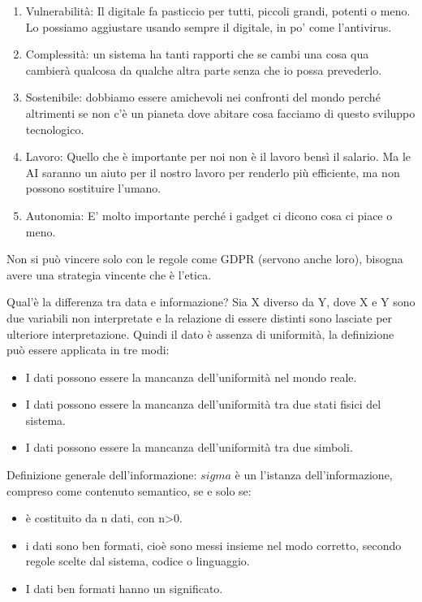 \documentclass[]{article}
\begin{document}
\begin{enumerate}
	\def\labelenumi{\arabic{enumi})}
	 
	\item
	Vulnerabilità: Il digitale fa pasticcio per tutti, piccoli grandi,
	potenti o meno. Lo possiamo aggiustare usando sempre il digitale, in
	po' come l'antivirus.
	\item
	Complessità: un sistema ha tanti rapporti che se cambi una cosa qua
	cambierà qualcosa da qualche altra parte senza che io possa
	prevederlo. 
	\item
	Sostenibile: dobbiamo essere amichevoli nei confronti del mondo perché
	altrimenti se non c'è un pianeta dove abitare cosa facciamo di questo
	sviluppo tecnologico. 
	\item
	Lavoro: Quello che è importante per noi non è il lavoro bensì il
	salario. Ma le AI saranno un aiuto per il nostro lavoro per renderlo
	più efficiente, ma non possono sostituire l'umano.
	\item
	Autonomia: E' molto importante perché i gadget ci dicono cosa ci piace
	o meno.
\end{enumerate}

Non si può vincere solo con le regole come GDPR (servono anche loro),
bisogna avere una strategia vincente che è l'etica.

Qual'è la differenza tra data e informazione? Sia X diverso da Y, dove X
e Y sono due variabili non interpretate e la relazione di essere
distinti sono lasciate per ulteriore interpretazione. Quindi il dato è
assenza di uniformità, la definizione può essere applicata in tre modi:

\begin{itemize}
	 
	\item
	I dati possono essere la mancanza dell'uniformità nel mondo reale.
	\item
	I dati possono essere la mancanza dell'uniformità tra due stati fisici
	del sistema.
	\item
	I dati possono essere la mancanza dell'uniformità tra due simboli.
\end{itemize}

Definizione generale dell'informazione: $sigma$ è un l'istanza
dell'informazione, compreso come contenuto semantico, se e solo se:

\begin{itemize}
	 
	\item
	è costituito da n dati, con n\textgreater{}0.
	\item
	i dati sono ben formati, cioè sono messi insieme nel modo corretto,
	secondo regole scelte dal sistema, codice o linguaggio.
	\item
	I dati ben formati hanno un significato.
\end{itemize}
\end{document}
